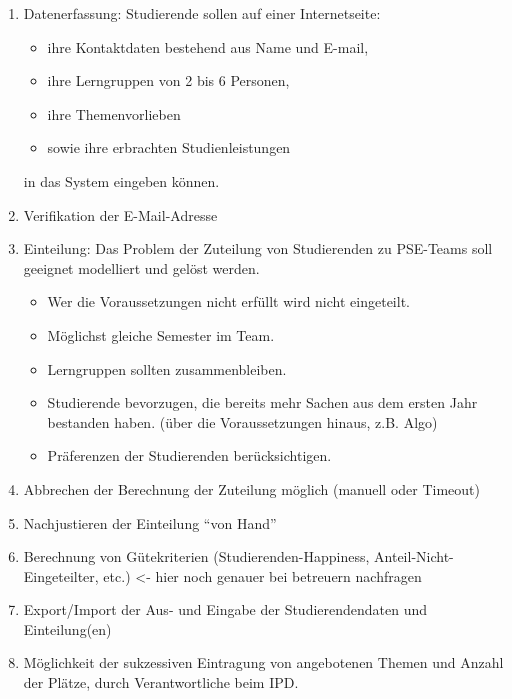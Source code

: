 \documentclass[parskip=full]{scrartcl}
\begin{document}
\begin{enumerate}[{Z}1]
    \item Datenerfassung: Studierende sollen auf einer Internetseite:   
    \begin{itemize}
      \item ihre Kontaktdaten bestehend aus Name und E-mail,
      \item ihre Lerngruppen von 2 bis 6 Personen,
      \item ihre Themenvorlieben 
      \item sowie ihre erbrachten Studienleistungen 
    \end{itemize}
    in das System eingeben können.
    
\item  Verifikation der E-Mail-Adresse
    

    \item Einteilung: Das Problem der Zuteilung von Studierenden zu PSE-Teams
    soll geeignet modelliert und gelöst werden. 
        \begin{itemize}
        \item Wer die Voraussetzungen nicht erfüllt wird nicht eingeteilt.

        \item Möglichst gleiche Semester im Team.

        \item Lerngruppen sollten zusammenbleiben.

        \item Studierende bevorzugen, die bereits mehr Sachen aus dem ersten Jahr
        bestanden haben. (über die Voraussetzungen hinaus, z.B. Algo)

        \item Präferenzen der Studierenden berücksichtigen.
        \end{itemize}

    \item Abbrechen der Berechnung der Zuteilung möglich (manuell oder Timeout)

    \item Nachjustieren der Einteilung “von Hand”

    \item Berechnung von Gütekriterien (Studierenden-Happiness,
    Anteil-Nicht-Eingeteilter, etc.) <- hier noch genauer bei betreuern
    nachfragen

    

    \item Export/Import der Aus- und Eingabe der Studierendendaten und
    Einteilung(en)

    \item Möglichkeit der sukzessiven Eintragung von angebotenen Themen und
    Anzahl der Plätze, durch Verantwortliche beim IPD.



    

    
\end{enumerate}
\end{document}
